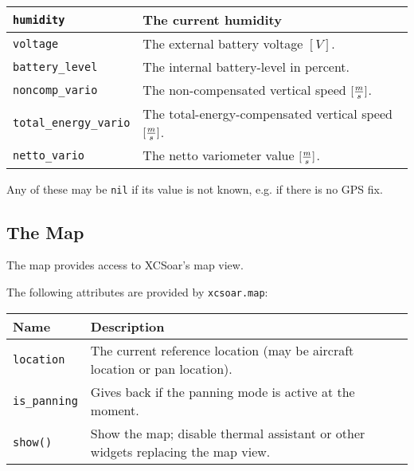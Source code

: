 \begin{maxipage}
\begin{tabularx}{1.9\textwidth}{l|X}
\hline

\verb|humidity| & The current humidity \\

\hline

\verb|voltage| & The external battery voltage
$[{V}]$. \\

\hline

\verb|battery_level| & The internal battery-level in percent. \\

\hline

\verb|noncomp_vario| & The non-compensated vertical speed
$[{m \over s}]$. \\

\hline

\verb|total_energy_vario| & The total-energy-compensated vertical speed
$[{m \over s}]$. \\

\hline

\verb|netto_vario| & The netto variometer value
$[{m \over s}]$. \\

\end{tabularx}
\end{maxipage}

Any of these may be \verb|nil| if its value is not known, e.g. if
there is no GPS fix.

\subsection{The Map}

The map provides access to XCSoar's map view.

The following attributes are provided by \verb|xcsoar.map|:

\begin{maxipage}
\begin{tabularx}{1.9\textwidth}{l|X}
Name & Description \\
\hline\hline

\verb|location| & The current reference location (may be aircraft location or
pan location). \\

\hline

\verb|is_panning| & Gives back if the panning mode is active at the moment.\\

\hline

\verb|show()| & Show the map; disable thermal assistant or other
widgets replacing the map view. \\

\end{tabularx}
\end{maxipage}

